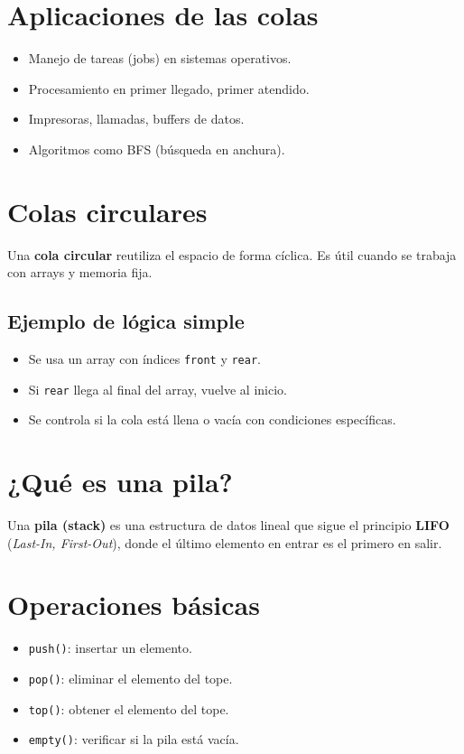 \documentclass[a4paper]{article}
\begin{document}
\section{Aplicaciones de las colas}

\begin{itemize}
    \item Manejo de tareas (jobs) en sistemas operativos.
    \item Procesamiento en primer llegado, primer atendido.
    \item Impresoras, llamadas, buffers de datos.
    \item Algoritmos como BFS (búsqueda en anchura).
\end{itemize}

\section{Colas circulares}

Una \textbf{cola circular} reutiliza el espacio de forma cíclica. Es útil cuando se trabaja con arrays y memoria fija.

\subsection*{Ejemplo de lógica simple}

\begin{itemize}
    \item Se usa un array con índices \texttt{front} y \texttt{rear}.
    \item Si \texttt{rear} llega al final del array, vuelve al inicio.
    \item Se controla si la cola está llena o vacía con condiciones específicas.
\end{itemize}
\newpage
\section{¿Qué es una pila?}

Una \textbf{pila (stack)} es una estructura de datos lineal que sigue el principio \textbf{LIFO} (\textit{Last-In, First-Out}), donde el último elemento en entrar es el primero en salir.

\section{Operaciones básicas}

\begin{itemize}
    \item \texttt{push()}: insertar un elemento.
    \item \texttt{pop()}: eliminar el elemento del tope.
    \item \texttt{top()}: obtener el elemento del tope.
    \item \texttt{empty()}: verificar si la pila está vacía.
\end{itemize}
\end{document}
